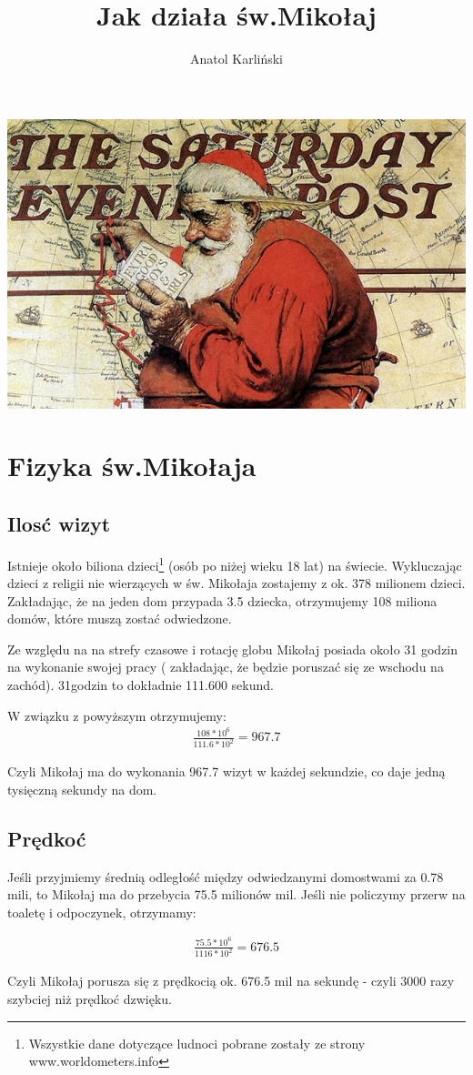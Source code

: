 \documentclass[12pt, a4paper]{article}
\author{Anatol Karliński}
\title{\LARGE Jak działa św.Mikołaj}
\date{\vspace{-0ex}}
\begin{document}
\maketitle
\includegraphics[center]{logo.jpg}
\tableofcontents
\section{Fizyka św.Mikołaja}
\subsection{Ilosć wizyt}
Istnieje około biliona dzieci\footnote{Wszystkie dane dotyczące ludnoci pobrane zostały ze strony www.worldometers.info} (osób po niżej wieku 18 lat) na świecie. Wykluczając dzieci z religii nie wierzących w św. Mikołaja zostajemy z ok. 378 milionem dzieci. Zakładając, że na jeden dom przypada 3.5 dziecka, otrzymujemy 108 miliona domów, które muszą zostać odwiedzone.\newline
\par
Ze względu na na strefy czasowe i rotację globu Mikołaj posiada około 31 godzin na wykonanie swojej pracy ( zakładając, że będzie poruszać się ze wschodu na zachód). 31godzin to dokładnie 111.600 sekund.\\
\begin{center}
W związku z powyższym otrzymujemy:
\begin{gather*}
\frac{108*10^6}{111.6*10^2}  = 967.7 
\end{gather*} 
\end{center}
Czyli Mikołaj ma do wykonania 967.7 wizyt w każdej sekundzie,
co daje jedną tysięczną sekundy na dom.
\subsection{Prędkoć}
\par
Jeśli przyjmiemy średnią odległość między odwiedzanymi domostwami za 0.78 mili, to Mikołaj ma do przebycia 75.5 milionów mil. Jeśli nie policzymy przerw na toaletę i odpoczynek, otrzymamy:
\begin{center}
\begin{gather*}
\frac{75.5*10^6}{1116*10^2} = 676.5
\end{gather*} 
\end{center}
Czyli Mikołaj porusza się z prędkocią ok. 676.5 mil na sekundę - czyli 3000 razy szybciej niż prędkoć dzwięku.
\end{document}
